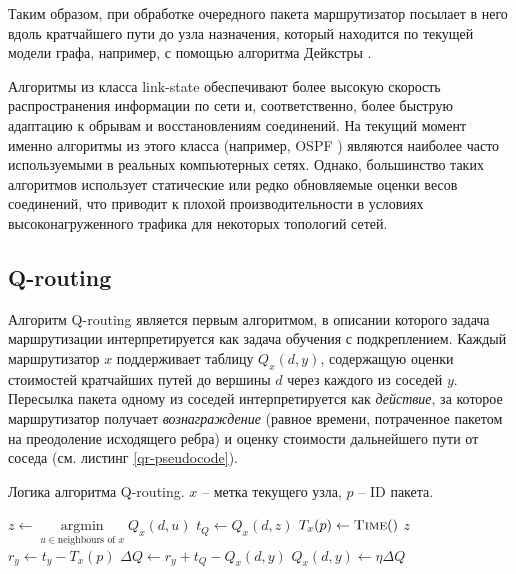 \documentclass[specification,annotation,times]{itmo-student-thesis}
\DeclareMathOperator{\argmin}{argmin}
\theoremstyle{definition}
\begin{document}
Таким образом, при обработке очередного пакета маршрутизатор посылает в него
вдоль кратчайшего пути до узла назначения, который находится по текущей модели
графа, например, с помощью алгоритма Дейкстры \cite{dijkstra}. 

Алгоритмы из класса link-state обеспечивают более высокую скорость
распространения информации по сети и, соответственно, более быструю адаптацию
к обрывам и восстановлениям соединений. На текущий момент именно алгоритмы из
этого класса (например, OSPF \cite{ospf-rfc}) являются наиболее часто
используемыми в реальных компьютерных сетях. Однако, большинство таких
алгоритмов использует статические или редко обновляемые оценки весов соединений,
что приводит к плохой производительности в условиях высоконагруженного трафика
для некоторых топологий сетей.

\subsection{Q-routing}\label{q-routing-desc}

Алгоритм Q-routing \cite{q-routing-orig} является первым алгоритмом, в описании
которого задача маршрутизации интерпретируется как задача обучения с
подкреплением. Каждый маршрутизатор $x$ поддерживает таблицу $Q_x(d, y)$,
содержащую оценки стоимостей кратчайших путей до вершины $d$ через каждого из соседей
$y$. Пересылка пакета одному из соседей интерпретируется как \textit{действие},
за которое маршрутизатор получает \textit{вознаграждение} (равное времени,
потраченное пакетом на преодоление исходящего ребра) и оценку стоимости
дальнейшего пути от соседа (см. листинг \ref{qr-pseudocode}). 

\begin{algorithm}[!h]
\caption{Логика алгоритма Q-routing. $x$ -- метка текущего узла, $p$ -- ID пакета.}
\label{qr-pseudocode}
\begin{algorithmic}[1]
   
    \State $z \gets \argmin\limits_{u \in \text{neighbours of } x} Q_x(d, u)$
    \State $t_Q \gets Q_x(d, z)$
    \State $T_x(p) \gets \textsc{Time}()$ 
    \State {}
    \State \Return $z$ 
  \EndFunction
  \Statex
    \State $r_y \gets t_y - T_x(p)$
    \State $\Delta Q \gets r_y + t_Q - Q_x(d, y)$
    \State $Q_x(d, y) \gets \eta \Delta Q$ 
  \EndProcedure
\end{algorithmic}
\end{algorithm}
\end{document}
